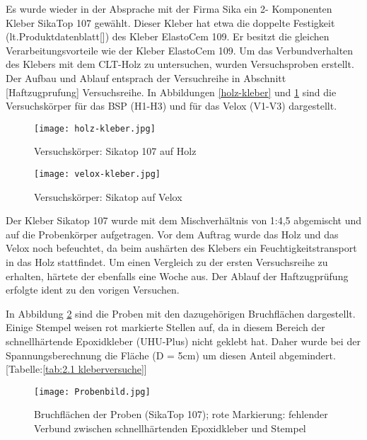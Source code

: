 \documentclass[12 pt,a4 paper ]{scrreprt}
\begin{document}
Es wurde wieder in der Absprache mit der Firma Sika ein  2- Komponenten Kleber  SikaTop 107 gewählt. Dieser Kleber hat etwa die doppelte Festigkeit (lt.Produktdatenblatt[]) des Kleber ElastoCem 109. Er besitzt die gleichen Verarbeitungsvorteile wie der Kleber ElastoCem 109.
 Um das Verbundverhalten des Klebers mit dem CLT-Holz zu untersuchen, wurden Versuchsproben erstellt. Der Aufbau und Ablauf entsprach der Versuchreihe in Abschnitt [Haftzugprufung] Versuchsreihe.
In Abbildungen \ref{holz-kleber} und \ref{velox-kleber} sind die Versuchskörper für das BSP (H1-H3) und für das Velox (V1-V3) dargestellt.


\begin{figure} 
\begin{minipage}[hbt]{7cm}	
	\texttt{[image: holz-kleber.jpg]}
	\caption{Versuchskörper: Sikatop 107 auf Holz}
	\label{holz-kleber}
\end{minipage}
\hfill
\begin{minipage}[hbt]{7cm}
	\texttt{[image: velox-kleber.jpg]}
	\caption{Versuchskörper: Sikatop auf Velox}
	\label{velox-kleber}
\end{minipage}
\end{figure}

Der Kleber Sikatop 107 wurde mit dem Mischverhältnis von 1:4,5 abgemischt und auf die Probenkörper aufgetragen. Vor dem Auftrag wurde das Holz und das Velox noch befeuchtet, da beim aushärten des Klebers ein Feuchtigkeitstransport in das Holz stattfindet. Um einen Vergleich zu der ersten Versuchsreihe zu erhalten, härtete der ebenfalls eine Woche aus. Der Ablauf der Haftzugprüfung erfolgte ident zu den vorigen Versuchen.

In Abbildung \ref{probenbild} sind die Proben mit den dazugehörigen Bruchflächen dargestellt. Einige Stempel weisen rot markierte Stellen auf, da in diesem Bereich der schnellhärtende Epoxidkleber (UHU-Plus) nicht geklebt hat. Daher wurde bei der Spannungsberechnung die Fläche (D = 5cm) um diesen Anteil abgemindert. [Tabelle:\ref{tab:2.1 kleberversuche}]

\begin{figure}
\begin{center}
\texttt{[image: Probenbild.jpg]}
\caption{Bruchflächen der Proben (SikaTop 107); rote Markierung: fehlender Verbund zwischen schnellhärtenden Epoxidkleber und Stempel}
\label{probenbild}
\end{center}
\end{figure}
\end{document}
